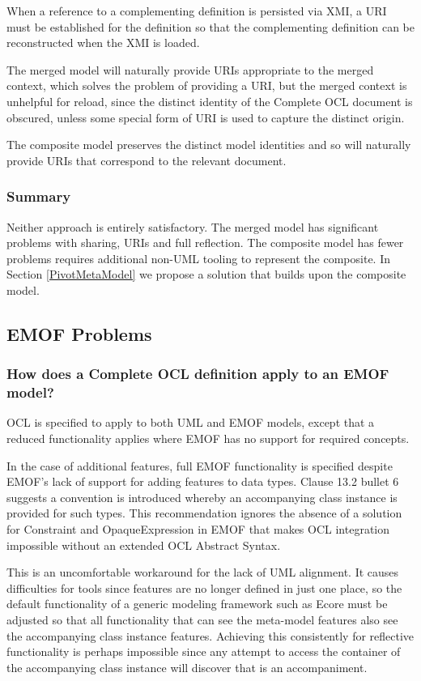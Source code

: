 \documentclass{eceasst}
\begin{document}
When a reference to a complementing definition is persisted via XMI, a URI must be established for the definition so that the complementing definition can be reconstructed when the XMI is loaded.

The merged model will naturally provide URIs appropriate to the merged context, which solves the problem of providing a URI, but the merged context is unhelpful for reload, since the distinct identity of the Complete OCL document is obscured, unless some special form of URI is used to capture the distinct origin.

The composite model preserves the distinct model identities and so will naturally provide URIs that correspond to the relevant document.

\subsubsection{Summary}

Neither approach is entirely satisfactory. The merged model has significant problems with sharing, URIs and full reflection. The composite model has fewer problems requires additional non-UML tooling to represent the composite. In Section \ref{PivotMetaModel} we propose a solution that builds upon the composite model.

\subsection{EMOF Problems}

\subsubsection{How does a Complete OCL definition apply to an EMOF model?}

OCL is specified to apply to both UML and EMOF models, except that a reduced functionality applies where EMOF has no support for required concepts.

In the case of additional features, full EMOF functionality is specified despite EMOF's lack of support for adding features to data types. Clause 13.2 bullet 6 suggests a convention is introduced whereby an accompanying class instance is provided for such types. This recommendation ignores the absence of a solution for Constraint and OpaqueExpression in EMOF that makes OCL integration impossible without an extended OCL Abstract Syntax.

This is an uncomfortable workaround for the lack of UML alignment. It causes difficulties for tools since features are no longer defined in just one place, so the default functionality of a generic modeling framework such as Ecore must be adjusted so that all functionality that can see the meta-model features also see the accompanying class instance features. Achieving this consistently for reflective functionality is perhaps impossible since any attempt to access the container of the accompanying class instance will discover that is  an accompaniment.
\end{document}
